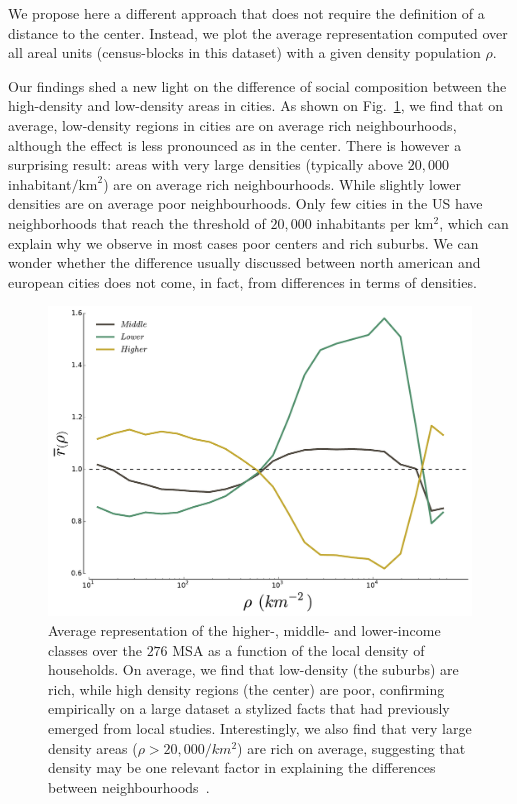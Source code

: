 We propose here a different approach that does not require the
definition of a distance to the center. Instead, we plot the average
representation computed over all areal units (census-blocks in this
dataset) with a given density population $\rho$.


Our findings shed a new light on the difference of social composition
between the high-density and low-density areas in cities. As shown on
Fig.~\ref{fig:high_low_densities}, we find that on average,
low-density regions in cities are on average rich neighbourhoods,
although the effect is less pronounced as in the center. There is
however a surprising result: areas with very large densities
(typically above $20,000$ inhabitant$/\text{km}^2$) are on average
rich neighbourhoods. While slightly lower densities are on average poor
neighbourhoods. Only few cities in the US have neighborhoods that
reach the threshold of $20,000$ inhabitants per km$^2$, which can
explain why we observe in most cases poor centers and rich suburbs. We
can wonder whether the difference usually discussed between north
american and european cities does not come, in fact, from differences
in terms of densities. 
\begin{figure}
    \centering
    \includegraphics[width=\textwidth]{gfx/chapter-segregation/figure4.pdf}
    \caption{Average representation of the higher-, middle- and
      lower-income classes over the $276$ MSA as a function of the
      local density of households. On average, we find that low-density (the
  suburbs) are rich, while high density regions (the center) are poor,
  confirming empirically on a large dataset a stylized facts that had previously
  emerged from local studies. Interestingly, we also
  find that  very large density areas ($\rho>20,000/km^2$) are rich on average,
  suggesting that density may be one relevant factor in explaining the
  differences between neighbourhoods~\cite{Jacobs:1961}.
  \label{fig:high_low_densities}} 
  \end{figure}

